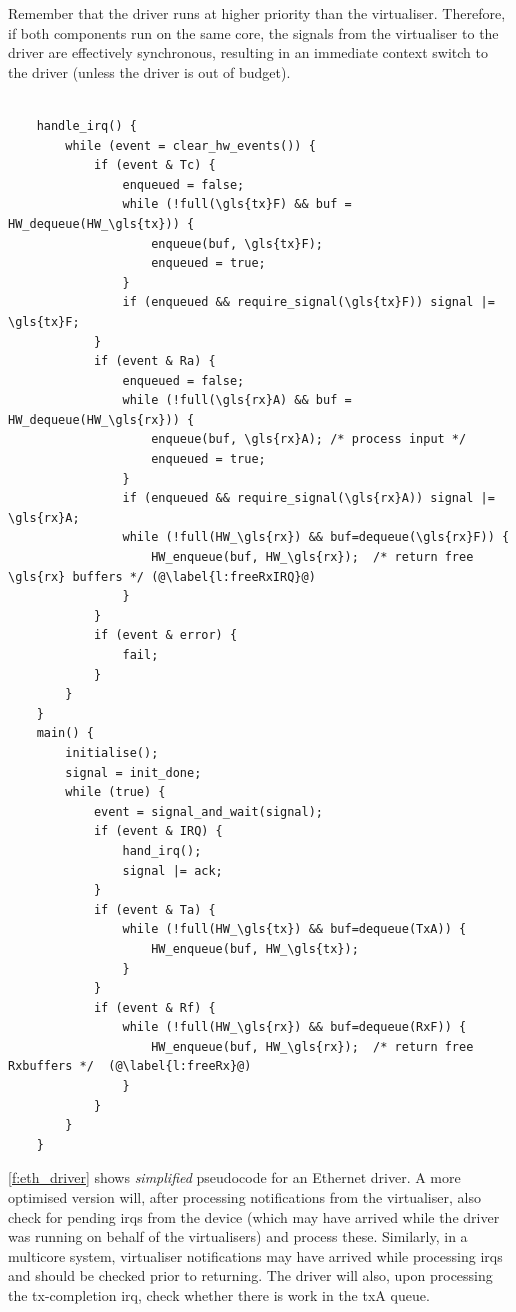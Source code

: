 \documentclass[a4paper,12pt]{report}
\newcommand{\Comment}[1]{\textbf{\textsl{#1}}}
\newcommand{\Comment}[1]{\relax}
\newcommand{\gernot}[1]{\Comment{#1 \colorbox{yellow}{[gernot]}}}
\begin{document}
Remember that the driver runs at higher priority than the
virtualiser. Therefore, if both components run on the same core, the
signals from the virtualiser to the driver are effectively synchronous,
resulting in an immediate context switch to the driver (unless the
driver is out of budget).

\begin{lstlisting}[gobble=2,firstline=2,float,tabsize=2,
  label={f:eth_driver},
  caption={Ethernet driver pseudocode.}]

	handle_irq() {
		while (event = clear_hw_events()) {
			if (event & Tc) {
				enqueued = false;
				while (!full(\gls{tx}F) && buf = HW_dequeue(HW_\gls{tx})) {
					enqueue(buf, \gls{tx}F);
					enqueued = true;
				}
				if (enqueued && require_signal(\gls{tx}F)) signal |= \gls{tx}F;
			}
			if (event & Ra) {
				enqueued = false;
				while (!full(\gls{rx}A) && buf = HW_dequeue(HW_\gls{rx})) {
					enqueue(buf, \gls{rx}A); /* process input */
					enqueued = true;
				}
				if (enqueued && require_signal(\gls{rx}A)) signal |= \gls{rx}A;
				while (!full(HW_\gls{rx}) && buf=dequeue(\gls{rx}F)) {
					HW_enqueue(buf, HW_\gls{rx});  /* return free \gls{rx} buffers */ (@\label{l:freeRxIRQ}@)
				}
			}
			if (event & error) {
	      		fail;
			}
		}
	}
	main() {
		initialise();
		signal = init_done;
		while (true) {
			event = signal_and_wait(signal);
			if (event & IRQ) {
				hand_irq();
				signal |= ack;
			}
			if (event & Ta) {
				while (!full(HW_\gls{tx}) && buf=dequeue(TxA)) {
					HW_enqueue(buf, HW_\gls{tx});
				}
			}
			if (event & Rf) {
				while (!full(HW_\gls{rx}) && buf=dequeue(RxF)) {
					HW_enqueue(buf, HW_\gls{rx});  /* return free Rxbuffers */  (@\label{l:freeRx}@)
				}
			}
		}
	}
\end{lstlisting}

\autoref{f:eth_driver} shows \emph{simplified} pseudocode for an Ethernet
driver.  A more optimised version will, after processing notifications
from the virtualiser, also check for pending \glspl{irq} from the device (which
may have arrived while the driver was running on behalf of the virtualisers)
and process these. Similarly, in a multicore system, virtualiser
notifications may have arrived while processing \glspl{irq} and should be
checked prior to returning. The driver will also, upon processing the
\gls{tx}-completion \gls{irq}, check whether there is work in the \gls{tx}A queue.
\end{document}
